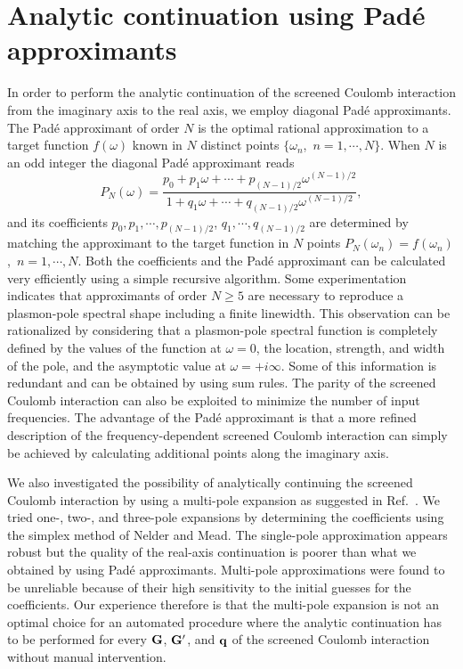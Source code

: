 \documentclass[twocolumn,prb,showpacs,superscriptaddress]{revtex4}
\def\w{\omega}
\def\q{{\bf q}}
\def\G{{\bf G}}
\def\Gp{{\bf G^\prime}}
\begin{document}
\section{Analytic continuation using Pad\'e approximants}\label{app.pade}

In order to perform the analytic continuation of the screened Coulomb interaction
from the imaginary axis to the real axis, we employ diagonal 
Pad\'e approximants.\cite{pade1,pade2,blochl}
The Pad\'e approximant of order $N$ is the optimal rational approximation
to a target function $f(\w)$ known in $N$ distinct points 
$\{\w_n$,~$n=1,\cdots,N\}$. 
When $N$ is an odd integer the diagonal Pad\'e approximant reads
  \begin{equation}
  P_N(\w) = \frac{p_0+p_1\w+\cdots+p_{(N-1)/2}\w^{(N-1)/2}}
  {1+q_1\w+\cdots+q_{(N-1)/2}\w^{(N-1)/2}},
  \end{equation}
and its coefficients $p_0, p_1, \cdots, p_{(N-1)/2}$, $q_1, \cdots, q_{(N-1)/2}$ are determined by matching the approximant
to the target function in $N$ points $P_N(\w_n)=f(\w_n)$,~$n=1,\cdots,N$.
Both the coefficients and the Pad\'e approximant can be calculated
very efficiently using a simple recursive algorithm.\cite{pade2}
Some experimentation indicates that approximants of order $N\ge5$ are necessary
to reproduce a plasmon-pole spectral shape including a finite linewidth.
This observation can be rationalized by considering that a plasmon-pole
spectral function is completely defined by the values of the function at $\w=0$,
the location, strength, and width of the pole, and the asymptotic value at $\w=+i\infty$.
Some of this information is redundant and can be obtained by using sum rules.\cite{hl86}
The parity of the screened Coulomb interaction can also be exploited to minimize
the number of input frequencies. 
The advantage of the Pad\'e approximant is that a more refined description
of the frequency-dependent screened Coulomb interaction can simply be achieved
by calculating additional points along the imaginary axis. 

We also investigated the possibility of analytically continuing
the screened Coulomb interaction by using a multi-pole expansion
as suggested in Ref.\ . 
We tried one-, two-, and three-pole
expansions by determining the coefficients using the simplex 
method of Nelder and Mead.\cite{nelder-mead}
The single-pole approximation appears robust but the quality
of the real-axis continuation is poorer than what we obtained
by using Pad\'e approximants. Multi-pole approximations were found
to be unreliable because of their high sensitivity to the initial guesses 
for the coefficients.
Our experience therefore is that the multi-pole expansion is not an optimal 
choice for an automated procedure where the analytic continuation has to be
performed for every $\G$, $\Gp$, and $\q$ of the screened Coulomb 
interaction without manual intervention. 
\end{document}
